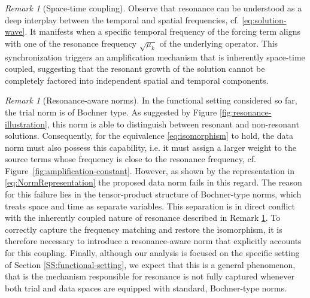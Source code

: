 \documentclass{amsart}
\theoremstyle{plain}
\theoremstyle{remark}
\newtheorem{remark}[theorem]{Remark}
\numberwithin{equation}{section}
\numberwithin{theorem}{section}
\begin{document}
\begin{remark}[Space-time coupling] 
\label{rem:SpaceTimeCoupling}
Observe that resonance can be understood as a deep interplay between the temporal and spatial frequencies, cf. \eqref{eq:solution-wave}. It manifests when a specific temporal frequency of the forcing term aligns with one of the resonance frequency $\sqrt{\mu_k}$ of the underlying operator. This synchronization triggers an amplification mechanism that is inherently space-time coupled, suggesting that the resonant growth of the solution cannot be completely factored into independent spatial and temporal components.
\end{remark}

\begin{remark}[Resonance-aware norms]
\label{rem:resonance-aware-norms}
In the functional setting considered so far, the trial norm is of Bochner type. As suggested by Figure \ref{fig:resonance-illustration}, this norm is able to distinguish between resonant and non-resonant solutions. Consequently, for the equivalence \eqref{eq:isomorphism} to hold, the data norm must also possess this capability, i.e. it must assign a larger weight to the source terms whose  frequency is close to the resonance frequency, cf. Figure~\ref{fig:amplification-constant}. However, as shown by the representation in \eqref{eq:NormRepresentation} the proposed data norm fails in this regard. The reason for this failure lies in the tensor-product structure of Bochner-type norms, which treats space and time as separate variables. This separation is in direct conflict with the inherently coupled nature of resonance described in Remark \ref{rem:SpaceTimeCoupling}. To correctly capture the frequency matching and restore the isomorphism, it is therefore necessary to introduce a  resonance-aware norm that explicitly accounts for this coupling. Finally, although our analysis is focused on the specific setting of Section \ref{SS:functional-setting}, we expect that this is a general phenomenon, that is the mechanism responsible for resonance is not fully captured whenever both trial and data spaces are equipped with standard, Bochner-type norms.  
\end{remark} 
\end{document}
